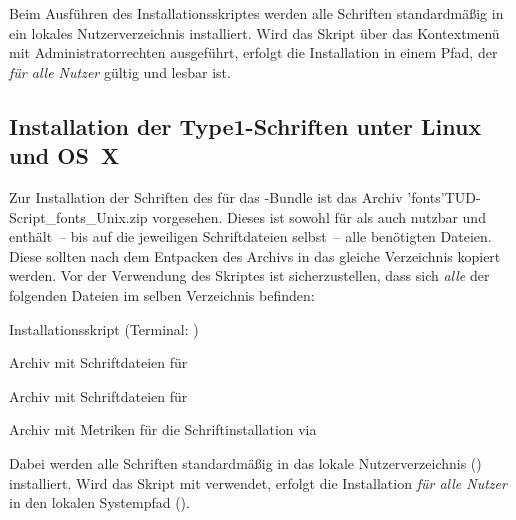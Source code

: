 Beim Ausführen des Installationsskriptes werden alle Schriften standardmäßig in 
ein lokales Nutzerverzeichnis installiert. Wird das Skript über das Kontextmenü 
mit Administratorrechten ausgeführt, erfolgt die Installation in einem Pfad, 
der \emph{für alle Nutzer} gültig und lesbar ist.



\subsection{%
  Installation der Type1-Schriften unter Linux und OS~X%
  \label{sec:install:unix}%
}

Zur Installation der Schriften des \CDs für das \TUDScript-Bundle ist das 
Archiv \GitHubDownload'fonts'{TUD-Script_fonts_Unix.zip} vorgesehen. Dieses 
ist sowohl für \TeXLive als auch \MacTeX nutzbar und enthält~-- bis auf die 
jeweiligen Schriftdateien selbst~-- alle benötigten Dateien. Diese sollten nach 
dem Entpacken des Archivs in das gleiche Verzeichnis kopiert werden. Vor der 
Verwendung des Skriptes  ist sicherzustellen, 
dass sich \emph{alle} der folgenden Dateien im selben Verzeichnis befinden:
%
\settowidth{}%
\begin{description}[labelwidth=\tudscrdim,labelsep=1em]
  \item[\File*{tudscr_fonts_install.sh}]Installationsskript
    (Terminal: )
  \item[\File*{Univers_PS.zip}]Archiv mit Schriftdateien für \Univers
  \item[\File*{DIN_Bd_PS.zip}]Archiv mit Schriftdateien für \DIN
  \item[\File*{tudscr_fonts_install.zip}]Archiv mit Metriken für die
    Schriftinstallation via 
\end{description}



Dabei werden alle Schriften standardmäßig in das lokale Nutzerverzeichnis 
() installiert. Wird das Skript mit  verwendet, 
erfolgt die Installation \emph{für alle Nutzer} in den lokalen Systempfad 
().

